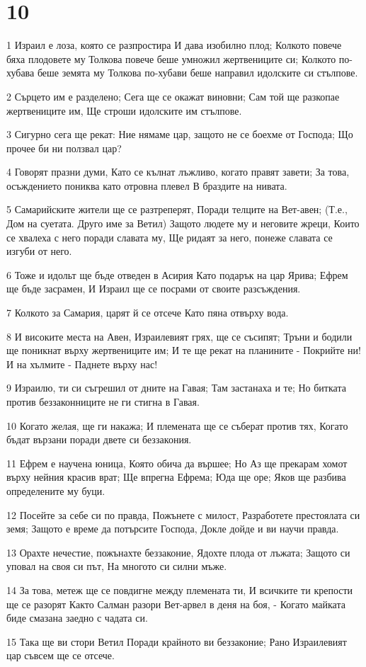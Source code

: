 \chapter{10}

\par 1 Израил е лоза, която се разпростира И дава изобилно плод; Колкото повече бяха плодовете му Толкова повече беше умножил жертвениците си; Колкото по-хубава беше земята му Толкова по-хубави беше направил идолските си стълпове.
\par 2 Сърцето им е разделено; Сега ще се окажат виновни; Сам той ще разкопае жертвениците им, Ще строши идолските им стълпове.
\par 3 Сигурно сега ще рекат: Ние нямаме цар, защото не се боехме от Господа; Що прочее би ни ползвал цар?
\par 4 Говорят празни  думи, Като се кълнат лъжливо, когато правят завети; За това, осъждението пониква като отровна плевел В браздите на нивата.
\par 5 Самарийските жители ще се разтреперят, Поради телците на Вет-авен; (Т.е., Дом на суетата. Друго име за Ветил) Защото людете му и неговите жреци, Които се хвалеха с него поради славата му, Ще ридаят за него, понеже славата се изгуби от него.
\par 6 Тоже и идольт ще бъде отведен в Асирия Като подарък на цар Ярива; Ефрем ще бъде засрамен, И Израил ще се посрами от своите разсъждения.
\par 7 Колкото за Самария, царят й се отсече Като пяна отвърху вода.
\par 8 И високите места на Авен, Израилевият грях, ще се съсипят; Тръни и бодили ще поникнат върху жертвениците им; И те ще рекат на планините - Покрийте ни! И на хълмите - Паднете върху нас!
\par 9 Израилю, ти си съгрешил от дните на Гавая; Там застанаха и те; Но битката против беззаконниците не ги стигна в Гавая.
\par 10 Когато желая, ще ги накажа; И племената ще се съберат против тях, Когато бъдат вързани поради двете си беззакония.
\par 11 Ефрем е научена юница, Която обича да вършее; Но Аз ще прекарам хомот върху нейния красив врат; Ще впрегна Ефрема; Юда ще оре; Яков ще разбива определените му буци.
\par 12 Посейте за себе си по правда, Пожънете с милост, Разработете престоялата си земя; Защото е време да потърсите Господа, Докле дойде и ви научи правда.
\par 13 Орахте нечестие, пожънахте беззаконие, Ядохте плода от лъжата; Защото си уповал на своя си път, На многото си силни мъже.
\par 14 За това, метеж ще се повдигне между племената ти, И всичките ти крепости ще се разорят Както Салман разори Вет-арвел в деня на боя, - Когато майката биде смазана заедно с чадата си.
\par 15 Така ще ви стори Ветил Поради крайното ви беззаконие; Рано Израилевият цар съвсем ще се отсече.

